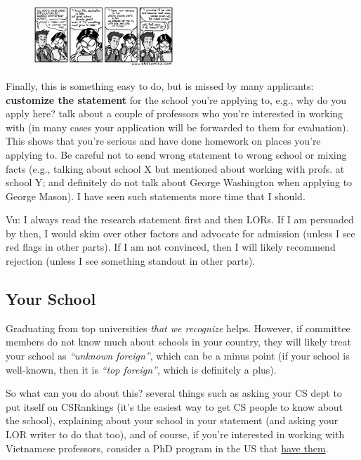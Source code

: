 \documentclass[11pt]{article}
\newenvironment{commentbox}{
 \small
    \begin{cbox}
 }{
   \end{cbox}
}
\begin{document}
\begin{figure}
\vspace{-0.4in}
  \begin{center}
    \includegraphics[width=0.47\textwidth]{c2.png}
  \end{center}
\vspace{-0.35in}  
\end{figure}
Finally, this is something easy to do, but is missed by many
applicants: \textbf{customize the statement} for the school you're applying to,
e.g., why do you apply here? talk about a couple of professors who you're interested in working with (in many cases your application will be forwarded to them for evaluation).
This shows that you're serious and have done homework on places you're applying to.
Be careful not to send wrong statement to wrong school or mixing
facts (e.g., talking about school X but mentioned about working with
profs. at school Y; and definitely do not talk about George Washington when applying to George Mason). I have seen such statements more time that I
should.


\begin{commentbox}
\small
Vu: I always read the research statement first and then LORs. If I am
persuaded by then, I would skim over other factors and advocate for
admission (unless I see red flags in other parts). If I am not
convinced, then I will likely recommend rejection (unless I see
something standout in other parts).
\end{commentbox}


\subsection{Your School}\label{sec:your-school}

Graduating from top universities \emph{that we recognize} helps.
However, if committee members do not know much about schools in your country, they will likely treat your school as
\emph{``unknown foreign''}, which can be a minus point (if your school is well-known, then it is \emph{``top foreign''}, which is definitely a plus).

So what can you do about this? several things such as asking your CS dept to put itself on CSRankings (it's the easiest way to get CS people to know about the school), explaining about your school in your statement (and asking your LOR writer to do that too), and of course, if you're interested in working with Vietnamese professors, consider a PhD program in the US that  \href{https://github.com/dynaroars/dynaroars.github.io/wiki/Viet-CS-Profs-US}{have them}.
\end{document}
